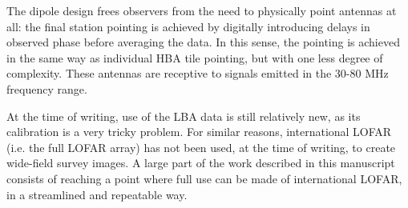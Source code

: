 \pg
The dipole design frees observers from the need to physically point antennas at all: the final station pointing is achieved by digitally introducing delays in observed phase before averaging the data. In this sense, the pointing is achieved in the same way as individual HBA tile pointing, but with one less degree of complexity. These antennas are receptive to signals emitted in the 30-80 MHz frequency range.

\pg
At the time of writing, use of the LBA data is still relatively new, as its calibration is a very tricky problem. For similar reasons, international LOFAR (i.e. the full LOFAR array) has not been used, at the time of writing, to create wide-field survey images. A large part of the work described in this manuscript consists of reaching a point where full use can be made of international LOFAR, in a streamlined and repeatable way. 

